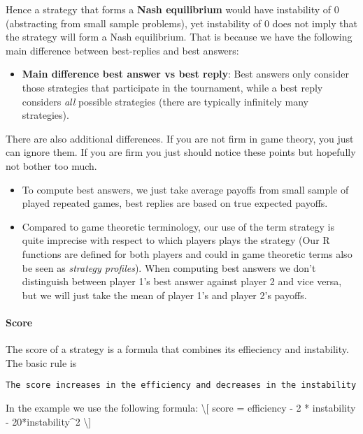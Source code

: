 \documentclass[]{article}
\begin{document}
Hence a strategy that forms a \textbf{Nash equilibrium} would have
instability of 0 (abstracting from small sample problems), yet
instability of 0 does not imply that the strategy will form a Nash
equilibrium. That is because we have the following main difference
between best-replies and best answers:

\begin{itemize}
\itemsep1pt\parskip0pt
\item
  \textbf{Main difference best answer vs best reply}: Best answers only
  consider those strategies that participate in the tournament, while a
  best reply considers \emph{all} possible strategies (there are
  typically infinitely many strategies).
\end{itemize}

There are also additional differences. If you are not firm in game
theory, you just can ignore them. If you are firm you just should notice
these points but hopefully not bother too much.

\begin{itemize}
\item
  To compute best answers, we just take average payoffs from small
  sample of played repeated games, best replies are based on true
  expected payoffs.
\item
  Compared to game theoretic terminology, our use of the term strategy
  is quite imprecise with respect to which players plays the strategy
  (Our R functions are defined for both players and could in game
  theoretic terms also be seen as \emph{strategy profiles}). When
  computing best answers we don't distinguish between player 1's best
  answer against player 2 and vice versa, but we will just take the mean
  of player 1's and player 2's payoffs.
\end{itemize}

\paragraph{Score}

The score of a strategy is a formula that combines its effieciency and
instability. The basic rule is

\begin{verbatim}
The score increases in the efficiency and decreases in the instability
\end{verbatim}

In the example we use the following formula: \textbackslash{}{[} score =
efficiency - 2 * instability - 20*instability\^{}2 \textbackslash{}{]}
\end{document}
